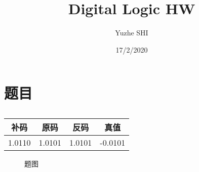 \documentclass{ctexart}
\title{Digital Logic HW}
\author{Yuzhe SHI}
\date{17/2/2020}
\begin{document}
\maketitle
\section{题目}
 



\begin{table}[h]
    \centering
    \begin{tabular}{c|c|c|c}
    \hline
         补码&原码&反码&真值  \\
         \hline
         1.0110&1.0101&1.0101&-0.0101\\
         \hline
    \end{tabular}
    \caption{}
    \label{tab:my_label}
\end{table}


\begin{figure}[h]
    \centering
    \caption{题图}
    \label{fig 1}
\end{figure}
\end{document}
